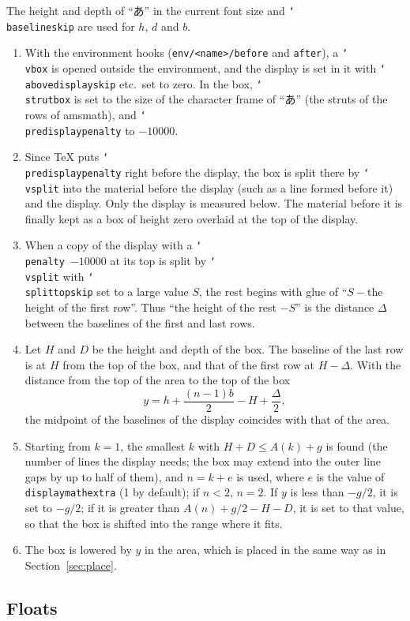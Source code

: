 \documentclass[paper=a4,dvipdfmx]{jlreq}
\newcommand\pkg[1]{\textsf{#1}}
\newcommand\opt[1]{\texttt{#1}}
\newcommand\cs[1]{\texttt{\char`\\#1}}
\begin{document}
The height and depth of ``あ'' in the current font size and \cs{baselineskip}
are used for $h$, $d$ and $b$.
\begin{enumerate}
\item With the environment hooks (\texttt{env/<name>/before} and \texttt{after}),
  a \cs{vbox} is opened outside the environment, and the display is set in it
  with \cs{abovedisplayskip} etc.\ set to zero.
  In the box, \cs{strutbox} is set to the size of the character frame of ``あ''
  (the struts of the rows of \pkg{amsmath}), and \cs{predisplaypenalty} to
  $-10000$.
\item Since \TeX{} puts \cs{predisplaypenalty} right before the display, the box
  is split there by \cs{vsplit} into the material before the display (such as a
  line formed before it) and the display. Only the display is measured below. The
  material before it is finally kept as a box of height zero overlaid at the top
  of the display.
\item When a copy of the display with a \cs{penalty}~$-10000$ at its top is split
  by \cs{vsplit} with \cs{splittopskip} set to a large value $S$, the rest begins
  with glue of ``$S-{}$the height of the first row''. Thus ``the height of the
  rest $-S$'' is the distance $\Delta$ between the baselines of the first and last
  rows.
\item Let $H$ and $D$ be the height and depth of the box. The baseline of the
  last row is at $H$ from the top of the box, and that of the first row at
  $H-\Delta$. With the distance from the top of the area to the top of the box
  \[ y = h + \frac{(n-1)b}{2} - H + \frac{\Delta}{2}, \]
  the midpoint of the baselines of the display coincides with that of the area.
\item Starting from $k=1$, the smallest $k$ with $H+D\le A(k)+g$ is found (the
  number of lines the display needs; the box may extend into the outer line gaps
  by up to half of them), and $n=k+e$ is used, where $e$ is the value of
  \opt{displaymathextra} (1 by default); if $n<2$, $n=2$. If $y$ is less than
  $-g/2$, it is set to $-g/2$; if it is greater than $A(n)+g/2-H-D$, it is set to
  that value, so that the box is shifted into the range where it fits.
\item The box is lowered by $y$ in the area, which is placed in the same way
  as in Section~\ref{sec:place}.
\end{enumerate}

\subsection{Floats}\label{sec:float-impl}
\end{document}
